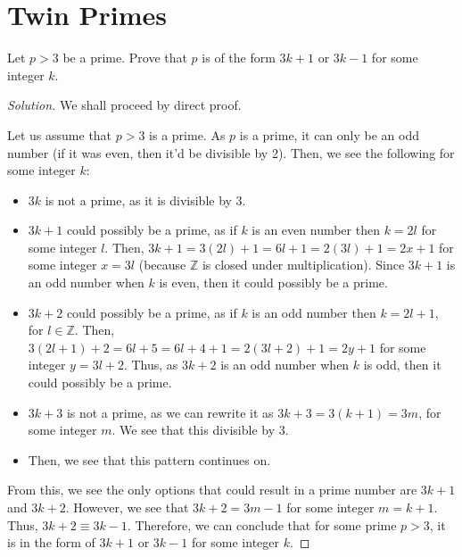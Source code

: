\documentclass{article}
\newenvironment{solution}{\begin{proof}[Solution]}{\end{proof}}
\newcommand{\ZZ}{\mathbb{Z}}
\begin{document}
\section{Twin Primes}
\begin{hw}
	Let $p>3$ be a prime. Prove that $p$ is of the form $3k+1$ or $3k-1$ for some integer $k$.
\end{hw}
\begin{solution}
	We shall proceed by direct proof.
	
	Let us assume that $p>3$ is a prime. As $p$ is a prime, it can only be an odd number (if it was even, then it'd be divisible by 2). Then, we see the following for some integer $k$:
	\begin{itemize}
		\item $3k$ is not a prime, as it is divisible by $3$.
		\item $3k+1$ could possibly be a prime, as if $k$ is an even number then $k=2l$ for some integer $l$. Then, $3k+1=3(2l)+1=6l+1=2(3l)+1=2x+1$ for some integer $x=3l$ (because $\ZZ$ is closed under multiplication). Since $3k+1$ is an odd number when $k$ is even, then it could possibly be a prime.
		\item $3k+2$ could possibly be a prime, as if $k$ is an odd number then $k=2l+1$, for $l\in\ZZ$. Then, $3(2l+1)+2=6l+5=6l+4+1=2(3l+2)+1=2y+1$ for some integer $y=3l+2$. Thus, as $3k+2$ is an odd number when $k$ is odd, then it could possibly be a prime.
		\item $3k+3$ is not a prime, as we can rewrite it as $3k+3 = 3\left( k+1 \right)=3m$, for some integer $m$. We see that this divisible by $3$.
		\item Then, we see that this pattern continues on.
	\end{itemize}
	
	From this, we see the only options that could result in a prime number are $3k+1$ and $3k+2$. However, we see that $3k+2 = 3m-1$ for some integer $m=k+1$. Thus, $3k+2 \equiv 3k-1$. Therefore, we can conclude that for some prime $p>3$, it is in the form of $3k+1$ or $3k-1$ for some integer $k$.
\end{solution}
\end{document}

